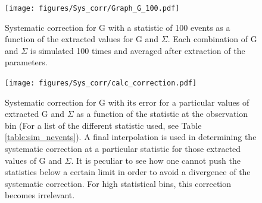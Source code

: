 \begin{figure}[htb]
  \begin{center}
    \texttt{[image: figures/Sys\_corr/Graph\_G\_100.pdf]} \\
    \caption{Systematic correction for G with a statistic of 100 events as a function of the extracted values for G and $\Sigma$. Each combination of G and $\Sigma$ is simulated 100 times and averaged after extraction of the parameters. }
    \label{fig:sys_correction_100}
  \end{center}
\end{figure}
\begin{figure}[htb]
  \begin{center}
    \texttt{[image: figures/Sys\_corr/calc\_correction.pdf]} \\
    \caption{Systematic correction for G with its error for a particular values of extracted G and $\Sigma$ as a function of the statistic at the observation bin (For a list of the different statistic used, see Table \ref{table:sim_nevents}). A final interpolation is used in determining the systematic correction at a particular statistic for those extracted values of G and $\Sigma$. It is peculiar to see how one cannot push the statistics below a certain limit in order to avoid a divergence of the systematic correction. For high statistical bins, this correction becomes irrelevant. }
    \label{fig:calc_sys_correction}
  \end{center}
\end{figure}

